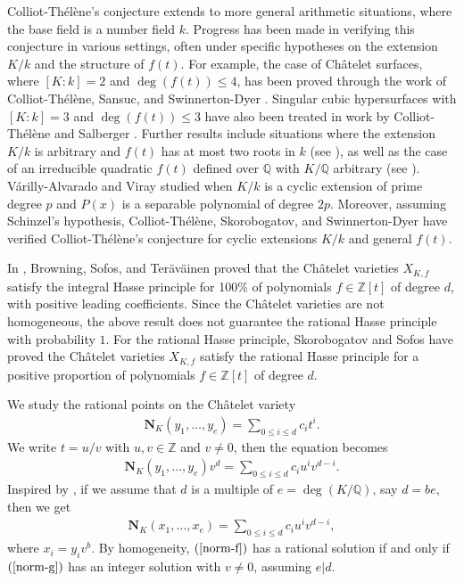 \documentclass[reqno, 11pt]{amsart}
\renewcommand{\leq}{\leqslant}
\theoremstyle{definition}
\theoremstyle{definition}
\renewcommand{\leq}{\leqslant}
\newcommand{\QQ}{\mathbb{Q}}
\newcommand{\ZZ}{\mathbb{Z}}
\numberwithin{equation}{section}
\begin{document}
Colliot-Th\'el\`ene's conjecture extends to more general arithmetic situations, where the base field is a number field \( k \). Progress has been made in verifying this conjecture in various settings, often under specific hypotheses on the extension \( K/k \) and the structure of \( f(t) \). For example, the case of Ch\^atelet surfaces, where \( [K : k] = 2 \) and \( \deg(f(t)) \leq 4 \), has been proved through the work of Colliot-Th\'el\`ene, Sansuc, and Swinnerton-Dyer \cite{CT-D-SD-1, CT-D-SD-2}. Singular cubic hypersurfaces with \( [K : k] = 3 \) and \( \deg(f(t)) \leq 3 \) have also been treated in work by Colliot-Th\'el\`ene and Salberger \cite{CT-S}.
Further results include situations where the extension \( K/k \) is arbitrary and \( f(t) \) has at most two roots in \( k \) (see \cite{CT-H-S, HB-Sko, Sch-Sko, Jones}), as well as the case of an irreducible quadratic \( f(t) \) defined over \( \mathbb{Q} \) with \( K/\mathbb{Q} \) arbitrary (see \cite{BHB, DSW}). V\'arilly-Alvarado and Viray \cite{VA-V} studied when $K/k$ is a cyclic extension of prime degree $p$ and $P(x)$ is a separable polynomial of degree $2p$. Moreover, assuming Schinzel's hypothesis, Colliot-Th\'el\`ene, Skorobogatov, and Swinnerton-Dyer \cite{CT-Sko-SD} have verified Colliot-Th\'el\`ene's conjecture for cyclic extensions \( K/k \) and general \( f(t) \).



In \cite[Theorem 1.6]{BST}, Browning, Sofos, and Ter\"av\"ainen proved that the Ch\^atelet varieties $X_{K, f}$ satisfy the integral Hasse principle for 100\% of polynomials $f \in \ZZ[t]$ of degree $d$, with positive leading coefficients. Since the Ch\^atelet varieties are not homogeneous, the above result does not guarantee the rational Hasse principle with probability $1$. For the rational Hasse principle, Skorobogatov and Sofos \cite[Theorem 1.3]{SS} have proved the Ch\^atelet varieties $X_{K, f}$ satisfy the rational Hasse principle for a positive proportion of polynomials $f \in \ZZ[t]$ of degree $d$. 

We study the rational points on the Ch\^atelet variety
	\begin{eqnarray*}
		\mathbf{N}_K(y_1, \dots, y_e) = \sum_{0 \leq i \leq d} c_i t^i.
	\end{eqnarray*}
	We write $t = u/v$ with $u, v \in \ZZ$ and $v \neq 0$, then the equation becomes
	\begin{eqnarray*}
		\mathbf{N}_K(y_1, \dots, y_e) v^d = \sum_{0 \leq i \leq d} c_i u^i v^{d-i}.
	\end{eqnarray*}
	Inspired by \cite{VA-V}, if we assume that $d$ is a multiple of $e = \deg(K / \QQ)$, say $d = be$, then we get 
	\begin{eqnarray}\label{norm-g}
		\mathbf{N}_K(x_1, \dots, x_e) = \sum_{0 \leq i \leq d} c_i u^i v^{d-i},
	\end{eqnarray}
where $x_i = y_i v^b$.
By homogeneity, $(\ref{norm-f})$ has a rational solution if and only if $(\ref{norm-g})$ has an integer solution with $v \neq 0$, assuming $e|d$.
	
\end{document}
